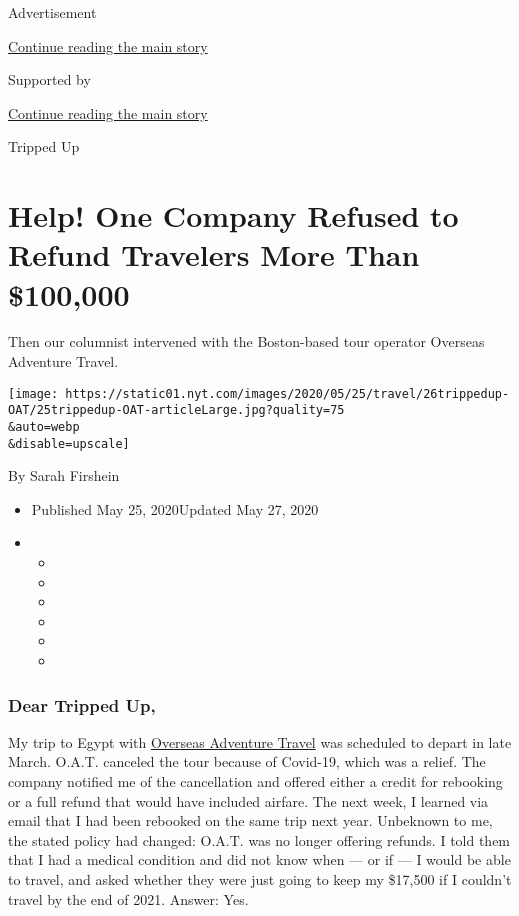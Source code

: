 Advertisement

\protect\hyperlink{after-top}{Continue reading the main story}

Supported by

\protect\hyperlink{after-sponsor}{Continue reading the main story}

Tripped Up

\hypertarget{help-one-company-refused-to-refund-travelers-more-than-100000}{%
\section{Help! One Company Refused to Refund Travelers More Than
\$100,000}\label{help-one-company-refused-to-refund-travelers-more-than-100000}}

Then our columnist intervened with the Boston-based tour operator
Overseas Adventure Travel.

\texttt{[image: https://static01.nyt.com/images/2020/05/25/travel/26trippedup-OAT/25trippedup-OAT-articleLarge.jpg?quality=75\\\&auto=webp\\\&disable=upscale]}

By Sarah Firshein

\begin{itemize}
\item
  Published May 25, 2020Updated May 27, 2020
\item
  \begin{itemize}
  \item
  \item
  \item
  \item
  \item
  \item
  \end{itemize}
\end{itemize}

\hypertarget{dear-tripped-up}{%
\subsubsection{\texorpdfstring{\textbf{Dear Tripped
Up,}}{Dear Tripped Up,}}\label{dear-tripped-up}}

My trip to Egypt with \href{https://www.oattravel.com/}{Overseas
Adventure Travel} was scheduled to depart in late March. O.A.T. canceled
the tour because of Covid-19, which was a relief. The company notified
me of the cancellation and offered either a credit for rebooking or a
full refund that would have included airfare. The next week, I learned
via email that I had been rebooked on the same trip next year. Unbeknown
to me, the stated policy had changed: O.A.T. was no longer offering
refunds. I told them that I had a medical condition and did not know
when --- or if --- I would be able to travel, and asked whether they
were just going to keep my \$17,500 if I couldn't travel by the end of
2021. Answer: Yes.

